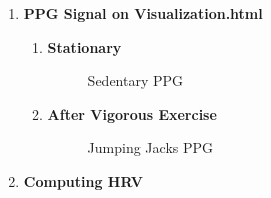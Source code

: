 \documentclass[12pt]{article}
\begin{document}
\begin{enumerate}
\item \textbf{PPG Signal on Visualization.html}
\begin{enumerate}

\item \textbf{Stationary}
\begin{figure}[!htb]
  \centering
  \caption{Sedentary PPG}
\end{figure}
\vspace{5mm}


\item \textbf{After Vigorous Exercise}
\begin{figure}[!htb]
  \centering
  \caption{Jumping Jacks PPG}
\end{figure}


\end{enumerate}

\newpage
\item \textbf{Computing HRV}


\end{enumerate}
\end{document}
